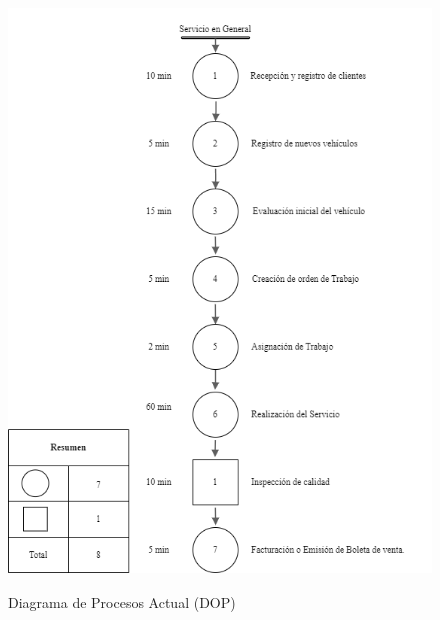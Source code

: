 \begin{figure}[H]
    \caption[Diagrama de Proceos Actual (DOP)]{Diagrama de Procesos Actual (DOP)}
    \centering
    \includegraphics[width=12cm, height=15cm]{imagenes/cap3/DiagramaDOP.drawio.png}
    \label{fig:DiagramaDOP}
\end{figure}


% 

